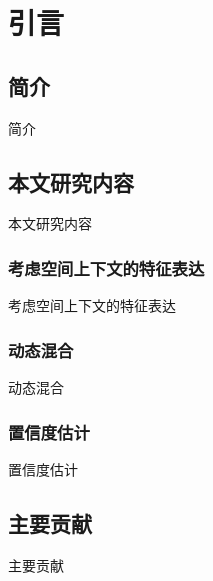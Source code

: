 \chapter{引言}

\section{简介}
简介
\section{本文研究内容}
本文研究内容
\subsection{考虑空间上下文的特征表达}
考虑空间上下文的特征表达
\subsection{动态混合}
动态混合
\subsection{置信度估计}
置信度估计~\cite{stamerjohanns2009mathml}


\section{主要贡献}
主要贡献

